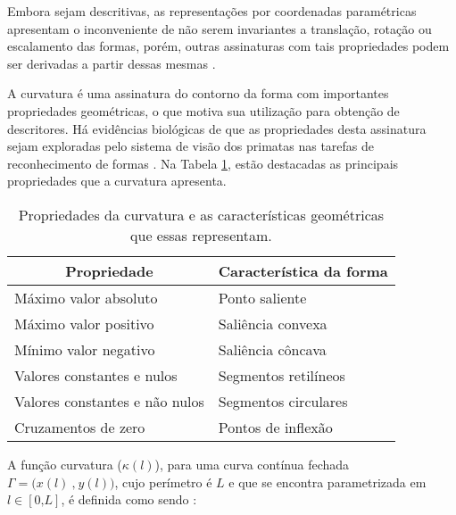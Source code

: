 
Embora sejam descritivas, as representações por coordenadas paramétricas apresentam o inconveniente de não serem invariantes a translação, rotação ou escalamento das formas, porém, outras assinaturas com tais propriedades podem ser derivadas a partir dessas mesmas \cite{Kindratenko:2003}.


A curvatura é uma assinatura do contorno da forma com importantes propriedades geométricas, o que motiva sua utilização para obtenção de descritores. Há evidências biológicas de que as propriedades desta assinatura sejam exploradas pelo sistema de visão dos primatas nas tarefas de reconhecimento de formas \cite{Costa:2009}. Na Tabela \ref{tbl:curv}, estão destacadas as principais propriedades que a curvatura apresenta.  

\begin{table}
\centering
\caption{\label{tbl:curv} Propriedades da curvatura e as características geométricas que essas representam.}
\begin{tabular}[]{ll}
\toprule
\multicolumn{1}{c|}{Propriedade} & \multicolumn{1}{c}{Característica da forma}\\ 
\hline
Máximo valor absoluto & Ponto saliente \\
Máximo valor positivo & Saliência convexa \\
Mínimo valor negativo & Saliência côncava \\
Valores constantes e nulos & Segmentos retilíneos \\
Valores constantes e não nulos & Segmentos circulares \\
Cruzamentos de zero & Pontos de inflexão \\ \bottomrule
\end{tabular}
\end{table}

A função curvatura ($\kappa(l)$), para uma curva contínua fechada $\Gamma = \big(x(l)\:\text{,}\:y(l)\big)$,  cujo perímetro é $L$ e que se encontra parametrizada em $l \in [0\text{,}L]$, é definida como sendo \cite{Kindratenko:2003}:

